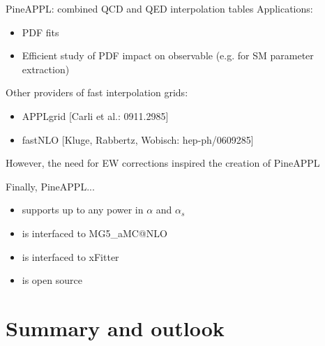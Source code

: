 \documentclass[aspectratio=169, 8pt,t]{beamer}
\begin{document}
\begin{frame}{PineAPPL: combined QCD and QED interpolation tables}
  Applications:
  \begin{itemize}
    \item PDF fits
    \item Efficient study of PDF impact on observable (e.g. for SM parameter extraction)
  \end{itemize}

  \vspace*{1em}
  Other providers of fast interpolation grids:
  \begin{itemize}
    \item APPLgrid {\color{gray}\small [Carli et al.: 0911.2985]}
    \item fastNLO {\color{gray}\small [Kluge, Rabbertz, Wobisch: hep-ph/0609285]}
  \end{itemize} 

  However, the need for EW corrections inspired the creation of PineAPPL
  
  \vspace*{1em}
  Finally, PineAPPL...
  \begin{itemize}
    \item supports up to any power in $\alpha$ and $\alpha_s$
    \item is interfaced to MG5\_aMC@NLO
    \item is interfaced to xFitter
    \item is open source
  \end{itemize}
\end{frame}



\section*{Summary and outlook}
\end{document}
